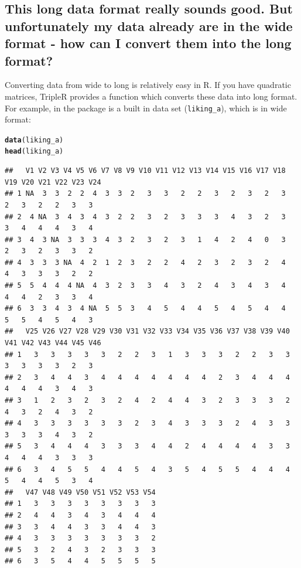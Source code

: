 \documentclass[a4paper]{article}\usepackage[]{graphicx}\usepackage[]{color}
\makeatletter
\newcommand{\hlstd}[1]{\textcolor[rgb]{0.345,0.345,0.345}{#1}}%
\newcommand{\hlkwd}[1]{\textcolor[rgb]{0.737,0.353,0.396}{\textbf{#1}}}%
\newenvironment{kframe}{%
 \def\at@end@of@kframe{}%
 \ifinner\ifhmode%
  \def\at@end@of@kframe{\end{minipage}}%
  \begin{minipage}{\columnwidth}%
 \fi\fi%
 \def\FrameCommand##1{\hskip\@totalleftmargin \hskip-\fboxsep
 \colorbox{shadecolor}{##1}\hskip-\fboxsep
     \hskip-\linewidth \hskip-\@totalleftmargin \hskip\columnwidth}%
 \MakeFramed {\advance\hsize-\width
   \@totalleftmargin\z@ \linewidth\hsize
   \@setminipage}}%
 {\par\unskip\endMakeFramed%
 \at@end@of@kframe}
\newenvironment{knitrout}{}{} %
\makeatother
\begin{document}



\subsection{This long data format really sounds good. But unfortunately my data already are in the wide format - how can I convert them into the long format?} %
\label{sub:this_long_data_format}

Converting data from wide to long is relatively easy in R. If you have quadratic matrices, TripleR provides a function which converts these data into long format. For example, in the package is a built in data set (\texttt{liking\_a}), which is in wide format:

\begin{knitrout}\small
{}\color{fgcolor}\begin{kframe}
\begin{alltt}
\hlkwd{data}\hlstd{(liking_a)}
\hlkwd{head}\hlstd{(liking_a)}
\end{alltt}
\begin{verbatim}
##   V1 V2 V3 V4 V5 V6 V7 V8 V9 V10 V11 V12 V13 V14 V15 V16 V17 V18 V19 V20 V21 V22 V23 V24
## 1 NA  3  3  2  2  4  3  3  2   3   3   2   2   3   2   3   2   3   2   3   2   2   3   3
## 2  4 NA  3  4  3  4  3  2  2   3   2   3   3   3   4   3   2   3   3   4   4   4   3   4
## 3  4  3 NA  3  3  3  4  3  2   3   2   3   1   4   2   4   0   3   2   3   2   3   3   2
## 4  3  3  3 NA  4  2  1  2  3   2   2   4   2   3   2   3   2   4   4   3   3   3   2   2
## 5  5  4  4  4 NA  4  3  2  3   3   4   3   2   4   3   4   3   4   4   4   2   3   3   4
## 6  3  3  4  3  4 NA  5  5  3   4   5   4   4   5   4   5   4   4   5   5   4   5   4   3
##   V25 V26 V27 V28 V29 V30 V31 V32 V33 V34 V35 V36 V37 V38 V39 V40 V41 V42 V43 V44 V45 V46
## 1   3   3   3   3   3   2   2   3   1   3   3   3   2   2   3   3   3   3   3   3   2   3
## 2   3   4   4   3   4   4   4   4   4   4   4   2   3   4   4   4   4   4   4   3   4   3
## 3   1   2   3   2   3   2   4   2   4   4   3   2   3   3   3   2   4   3   2   4   3   2
## 4   3   3   3   3   3   3   2   3   4   3   3   3   2   4   3   3   3   3   3   4   3   2
## 5   3   4   4   4   3   3   3   4   4   2   4   4   4   4   3   3   4   4   4   3   3   3
## 6   3   4   5   5   4   4   5   4   3   5   4   5   5   4   4   4   5   4   4   5   3   4
##   V47 V48 V49 V50 V51 V52 V53 V54
## 1   3   3   3   3   3   3   3   3
## 2   4   4   3   4   3   4   4   4
## 3   3   4   4   3   3   4   4   3
## 4   3   3   3   3   3   3   3   2
## 5   3   2   4   3   2   3   3   3
## 6   3   5   4   4   5   5   5   5
\end{verbatim}
\end{kframe}
\end{knitrout}
\end{document}
